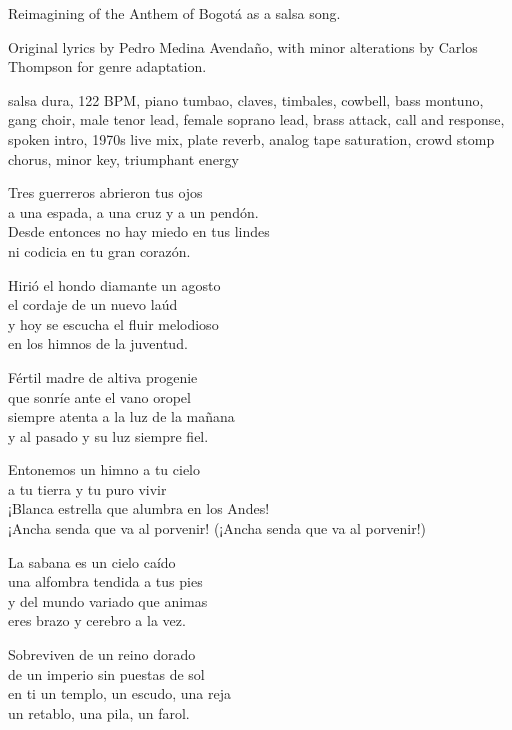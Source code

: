 
\label{sec:tu-puro-vivir}
\begin{notes}
Reimagining of the Anthem of Bogotá as a salsa song.

Original lyrics by Pedro Medina Avendaño, with minor alterations by Carlos Thompson for genre adaptation.
\end{notes}
\begin{style}
salsa dura, 122 BPM, piano tumbao, claves, timbales, cowbell, bass montuno, gang choir, male tenor lead, female soprano lead, brass attack, call and response, spoken intro, 1970s live mix, plate reverb, analog tape saturation, crowd stomp chorus, minor key, triumphant energy
\end{style}
\begin{lyrics}
Tres guerreros abrieron tus ojos\\
a una espada, a una cruz y a un pendón.\\
Desde entonces no hay miedo en tus lindes\\
ni codicia en tu gran corazón.

Hirió el hondo diamante un agosto\\
el cordaje de un nuevo laúd\\
y hoy se escucha el fluir melodioso\\
en los himnos de la juventud.

Fértil madre de altiva progenie\\
que sonríe ante el vano oropel\\
siempre atenta a la luz de la mañana\\
y al pasado y su luz siempre fiel.

Entonemos un himno a tu cielo\\
a tu tierra y tu puro vivir\\
¡Blanca estrella que alumbra en los Andes!\\
¡Ancha senda que va al porvenir!
(¡Ancha senda que va al porvenir!)

La sabana es un cielo caído\\
una alfombra tendida a tus pies\\
y del mundo variado que animas\\
eres brazo y cerebro a la vez.

Sobreviven de un reino dorado\\
de un imperio sin puestas de sol\\
en ti un templo, un escudo, una reja\\
un retablo, una pila, un farol.


\end{lyrics}
